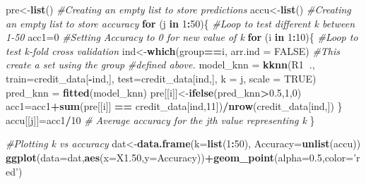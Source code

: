 \documentclass[
]{article}
\newenvironment{Shaded}{\begin{snugshade}}{\end{snugshade}}
\newcommand{\CommentTok}[1]{\textcolor[rgb]{0.56,0.35,0.01}{\textit{#1}}}
\newcommand{\ControlFlowTok}[1]{\textcolor[rgb]{0.13,0.29,0.53}{\textbf{#1}}}
\newcommand{\DataTypeTok}[1]{\textcolor[rgb]{0.13,0.29,0.53}{#1}}
\newcommand{\DecValTok}[1]{\textcolor[rgb]{0.00,0.00,0.81}{#1}}
\newcommand{\FloatTok}[1]{\textcolor[rgb]{0.00,0.00,0.81}{#1}}
\newcommand{\KeywordTok}[1]{\textcolor[rgb]{0.13,0.29,0.53}{\textbf{#1}}}
\newcommand{\NormalTok}[1]{#1}
\newcommand{\OperatorTok}[1]{\textcolor[rgb]{0.81,0.36,0.00}{\textbf{#1}}}
\newcommand{\OtherTok}[1]{\textcolor[rgb]{0.56,0.35,0.01}{#1}}
\newcommand{\StringTok}[1]{\textcolor[rgb]{0.31,0.60,0.02}{#1}}
\begin{document}
\begin{Shaded}
\begin{Highlighting}[]
\NormalTok{pre<-}\KeywordTok{list}\NormalTok{() }\CommentTok{#Creating an empty list to store predictions}
\NormalTok{accu<-}\KeywordTok{list}\NormalTok{() }\CommentTok{#Creating an empty list to store accuracy}
\ControlFlowTok{for}\NormalTok{ (j }\ControlFlowTok{in} \DecValTok{1}\OperatorTok{:}\DecValTok{50}\NormalTok{)\{   }\CommentTok{#Loop to test different k between 1-50}
\NormalTok{  acc1=}\DecValTok{0}           \CommentTok{#Setting Accuracy to 0 for new value of k}
  \ControlFlowTok{for}\NormalTok{ (i }\ControlFlowTok{in} \DecValTok{1}\OperatorTok{:}\DecValTok{10}\NormalTok{)\{ }\CommentTok{#Loop to test k-fold cross validation}
\NormalTok{    ind<-}\KeywordTok{which}\NormalTok{(group}\OperatorTok{==}\NormalTok{i, }\DataTypeTok{arr.ind =} \OtherTok{FALSE}\NormalTok{) }\CommentTok{#This create a set using the group }
                                          \CommentTok{#defined above.}
\NormalTok{    model_knn =}\StringTok{ }\KeywordTok{kknn}\NormalTok{(R1}\OperatorTok{~}\NormalTok{.,}
                     \DataTypeTok{train=}\NormalTok{credit_data[}\OperatorTok{-}\NormalTok{ind,], }
                     \DataTypeTok{test=}\NormalTok{credit_data[ind,], }
                     \DataTypeTok{k =}\NormalTok{ j, }
                     \DataTypeTok{scale =} \OtherTok{TRUE}\NormalTok{)}
\NormalTok{    pred_knn =}\StringTok{ }\KeywordTok{fitted}\NormalTok{(model_knn)}
\NormalTok{    pre[[i]]<-}\KeywordTok{ifelse}\NormalTok{(pred_knn}\OperatorTok{>}\FloatTok{0.5}\NormalTok{,}\DecValTok{1}\NormalTok{,}\DecValTok{0}\NormalTok{)}
\NormalTok{    acc1=acc1}\OperatorTok{+}\KeywordTok{sum}\NormalTok{(pre[[i]] }\OperatorTok{==}\StringTok{ }\NormalTok{credit_data[ind,}\DecValTok{11}\NormalTok{])}\OperatorTok{/}\KeywordTok{nrow}\NormalTok{(credit_data[ind,])}
\NormalTok{  \}}
\NormalTok{  accu[[j]]=acc1}\OperatorTok{/}\DecValTok{10} \CommentTok{# Average accuracy for the jth value representing k}
\NormalTok{\}}
\end{Highlighting}
\end{Shaded}

\begin{Shaded}
\begin{Highlighting}[]
\CommentTok{#Plotting k vs accuracy}
\NormalTok{dat<-}\KeywordTok{data.frame}\NormalTok{(}\DataTypeTok{k=}\KeywordTok{list}\NormalTok{(}\DecValTok{1}\OperatorTok{:}\DecValTok{50}\NormalTok{), }\DataTypeTok{Accuracy=}\KeywordTok{unlist}\NormalTok{(accu))}
\KeywordTok{ggplot}\NormalTok{(}\DataTypeTok{data=}\NormalTok{dat,}\KeywordTok{aes}\NormalTok{(}\DataTypeTok{x=}\NormalTok{X1}\FloatTok{.50}\NormalTok{,}\DataTypeTok{y=}\NormalTok{Accuracy))}\OperatorTok{+}\KeywordTok{geom_point}\NormalTok{(}\DataTypeTok{alpha=}\FloatTok{0.5}\NormalTok{,}\DataTypeTok{color=}\StringTok{'red'}\NormalTok{)}
\end{Highlighting}
\end{Shaded}
\end{document}
